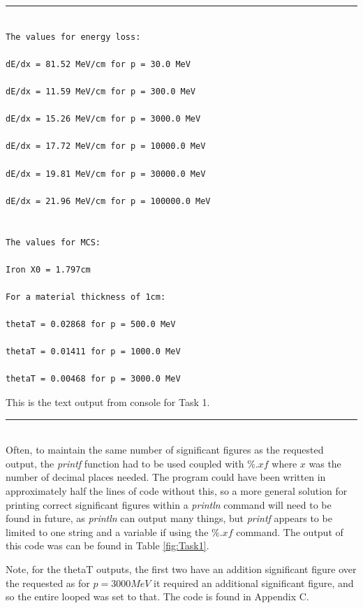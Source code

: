 \documentclass[twocolumn]{article}
\begin{document}
\begin{table}[h]
	\hrule
	\begin{lstlisting}	
																									The values for energy loss: 
																									dE/dx = 81.52 MeV/cm for p = 30.0 MeV
																									dE/dx = 11.59 MeV/cm for p = 300.0 MeV
																									dE/dx = 15.26 MeV/cm for p = 3000.0 MeV
																									dE/dx = 17.72 MeV/cm for p = 10000.0 MeV
																									dE/dx = 19.81 MeV/cm for p = 30000.0 MeV
																									dE/dx = 21.96 MeV/cm for p = 100000.0 MeV
																									
																									The values for MCS:
																									Iron X0 = 1.797cm
																									For a material thickness of 1cm:
																									thetaT = 0.02868 for p = 500.0 MeV
																									thetaT = 0.01411 for p = 1000.0 MeV
																									thetaT = 0.00468 for p = 3000.0 MeV
	\end{lstlisting}
	\caption{\label{tab:Task1} This is the text output from console for Task 1.}
	\hrule
\end{table} \\\indent Often, to maintain the same number of significant figures as the requested output, the \textit{printf} function had to be used coupled with $\%.xf$ where $x$ was the number of decimal places needed. The program could have been written in approximately half the lines of code without this, so a more general solution for printing correct significant figures within a \textit{println} command will need to be found in future, as \textit{println} can output many things, but \textit{printf} appears to be limited to one string and a variable if using the $\%.xf$ command. The output of this code was can be found in Table \ref{fig:Task1}.

Note, for the thetaT outputs, the first two have an addition significant figure over the requested as for $p = 3000MeV$ it required an additional significant figure, and so the entire looped was set to that. The code is found in Appendix C.
\end{document}
